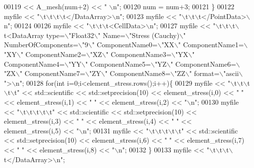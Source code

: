 \begin{DoxyCode}
00119         << A\_mesh(num+2) << \textcolor{stringliteral}{" \(\backslash\)n"};
00120             num = num+3;
00121     \}
00122     myfile << \textcolor{stringliteral}{"\(\backslash\)t\(\backslash\)t\(\backslash\)t\(\backslash\)t</DataArray>\(\backslash\)n"};
00123     myfile << \textcolor{stringliteral}{"\(\backslash\)t\(\backslash\)t\(\backslash\)t</PointData>\(\backslash\)n"};
00124 
00126     myfile << \textcolor{stringliteral}{"\(\backslash\)t\(\backslash\)t\(\backslash\)t<CellData>\(\backslash\)n"};
00127     myfile << \textcolor{stringliteral}{"\(\backslash\)t\(\backslash\)t\(\backslash\)t\(\backslash\)t<DataArray type=\(\backslash\)"Float32\(\backslash\)" Name=\(\backslash\)"Stress (Cauchy)\(\backslash\)" NumberOfComponents=\(\backslash\)"9\(\backslash\)"
       ComponentName0=\(\backslash\)"XX\(\backslash\)" ComponentName1=\(\backslash\)"XY\(\backslash\)" ComponentName2=\(\backslash\)"XZ\(\backslash\)" ComponentName3=\(\backslash\)"YX\(\backslash\)" ComponentName4=\(\backslash\)"YY\(\backslash\)"
       ComponentName5=\(\backslash\)"YZ\(\backslash\)" ComponentName6=\(\backslash\)"ZX\(\backslash\)" ComponentName7=\(\backslash\)"ZY\(\backslash\)" ComponentName8=\(\backslash\)"ZZ\(\backslash\)" format=\(\backslash\)"ascii\(\backslash\)">\(\backslash\)n"};
00128     \textcolor{keywordflow}{for}(\textcolor{keywordtype}{int} i=0;i<element\_stress.rows();i++)\{
00129             myfile << \textcolor{stringliteral}{"\(\backslash\)t\(\backslash\)t\(\backslash\)t\(\backslash\)t\(\backslash\)t"} << std::scientific << std::setprecision(10) << element\_stress(i,0) << \textcolor{stringliteral}{" 
      "} << element\_stress(i,1) << \textcolor{stringliteral}{" "} << element\_stress(i,2) << \textcolor{stringliteral}{"\(\backslash\)n"};
00130             myfile << \textcolor{stringliteral}{"\(\backslash\)t\(\backslash\)t\(\backslash\)t\(\backslash\)t\(\backslash\)t"} << std::scientific << std::setprecision(10) << element\_stress(i,3) << \textcolor{stringliteral}{" 
      "} << element\_stress(i,4) << \textcolor{stringliteral}{" "} << element\_stress(i,5) << \textcolor{stringliteral}{"\(\backslash\)n"};
00131             myfile << \textcolor{stringliteral}{"\(\backslash\)t\(\backslash\)t\(\backslash\)t\(\backslash\)t\(\backslash\)t"} << std::scientific << std::setprecision(10) << element\_stress(i,6) << \textcolor{stringliteral}{" 
      "} << element\_stress(i,7) << \textcolor{stringliteral}{" "} << element\_stress(i,8) << \textcolor{stringliteral}{"\(\backslash\)n"};
00132     \}
00133     myfile << \textcolor{stringliteral}{"\(\backslash\)t\(\backslash\)t\(\backslash\)t\(\backslash\)t</DataArray>\(\backslash\)n"};

\end{DoxyCode}
